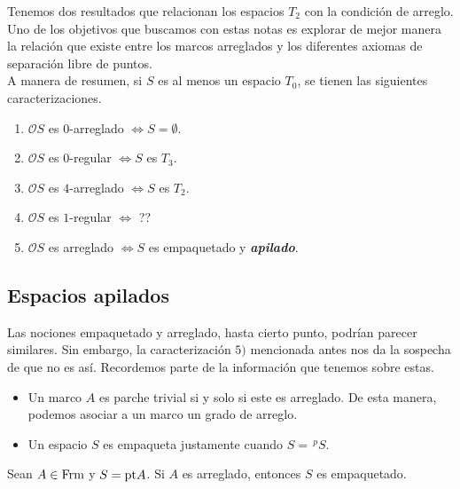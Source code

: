 Tenemos dos resultados que relacionan los espacios $T_2$ con la condición de arreglo. Uno de los objetivos que buscamos con estas notas es explorar de mejor manera la relación que existe entre los marcos arreglados y los diferentes axiomas de separación libre de puntos.\\

A manera de resumen, si $S$ es al menos un espacio $T_0$, se tienen las siguientes caracterizaciones.

\begin{enumerate}
    \item $\mathcal{O}S$ es $0$-arreglado $\Leftrightarrow S=\emptyset$.
    \item $\mathcal{O}S$ es $0$-regular $\Leftrightarrow S$ es $T_3$.
    \item $\mathcal{O}S$ es $4$-arreglado $\Leftrightarrow S$ es $T_2$.
    \item $\mathcal{O}S$ es $1$-regular $\Leftrightarrow$ ??
    \item $\mathcal{O}S$ es arreglado $\Leftrightarrow S$ es empaquetado y \textbf{\emph{apilado}}. 
\end{enumerate}

\subsection{Espacios apilados}

Las nociones empaquetado y arreglado, hasta cierto punto, podrían parecer similares. Sin embargo, la caracterización $5)$ mencionada antes nos da la sospecha de que no es así. Recordemos parte de la información que tenemos sobre estas.

\begin{itemize}
    \item Un marco $A$ es parche trivial si y solo si este es arreglado. De esta manera, podemos asociar a un marco un grado de arreglo.

    \item Un espacio $S$ es empaqueta justamente cuando $S=\,^pS$.
\end{itemize}

\begin{lem}\label{Lema8.5.1}
    Sean $A\in \mathrm{Frm}$ y $S=\mathrm{pt} A$. Si $A$ es arreglado, entonces $S$ es empaquetado.
\end{lem}

